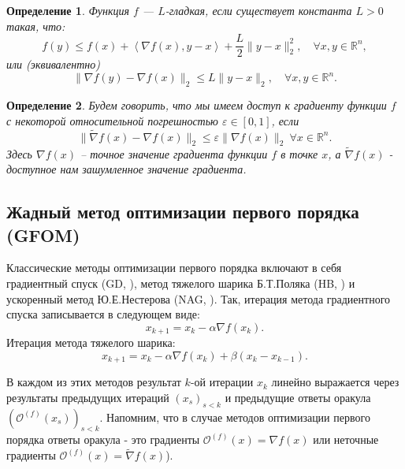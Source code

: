 \documentclass{article}
\newtheorem{Def}{Определение}[section]
\begin{document}
\begin{Def}
Функция $f$ --- $L$-гладкая, если существует константа $L > 0$ такая, что:
\begin{equation}\label{smoothness_cond}
    f(y) \leq f(x)+ \left\langle\nabla f(x), y-x\right\rangle + \frac{L}{2} \|y-x\|_2^2, \quad \forall x, y \in \mathbb{R}^n,
\end{equation}
или (эквивалентно) 
\begin{equation}\label{eq_6}
    \|\nabla f(y) - \nabla f(x)\|_2 \leq L \|y - x\|_2, \quad \forall x, y \in \mathbb{R}^n.
\end{equation}
\end{Def}

\begin{Def} \label{inexact_grad}
Будем говорить, что мы имеем доступ к градиенту функции $f$ с некоторой относительной погрешностью $\varepsilon \in [0, 1]$, если
\begin{equation}\label{eq_relative_error}
    \|\widetilde{\nabla} f(x) - \nabla f(x)\|_2 \leq \varepsilon\|\nabla f(x)\|_2 \ \forall x \in \mathbb{R}^n.
\end{equation}
Здесь $\nabla f(x)$ -- точное значение градиента функции $f$ в точке $x$, а $\widetilde{\nabla} f(x)$ - доступное нам зашумленное значение градиента.
\end{Def}


\subsection{Жадный метод оптимизации первого порядка (GFOM)}



Классические методы оптимизации первого порядка включают в себя градиентный спуск (GD, \cite{cauchy1847methode}), метод тяжелого шарика Б.Т.Поляка (HB, \cite{polyak1963gradient}) и ускоренный метод Ю.Е.Нестерова (NAG, \cite{nesterov1983method}). Так, итерация метода градиентного спуска записывается в следующем виде:
\[x_{k+1}  = x_k - \alpha \nabla f(x_k). \tag{GD}\]
Итерация метода тяжелого шарика:
\[x_{k+1} = x_k - \alpha \nabla f(x_k) + \beta (x_k - x_{k - 1}).\tag{HB}\]

В каждом из этих методов результат $k$-ой итерации $x_k$ линейно выражается через результаты предыдущих итераций $(x_s)_{s < k}$ и предыдущие ответы оракула $(\mathcal{O}^{(f)}(x_s))_{s < k}$. Напомним, что в случае методов оптимизации первого порядка ответы оракула - это градиенты $\mathcal{O}^{(f)}(x) = \nabla f(x)$ или неточные градиенты $\mathcal{O}^{(f)}(x) = \widetilde{\nabla} f(x)$).
\end{document}
